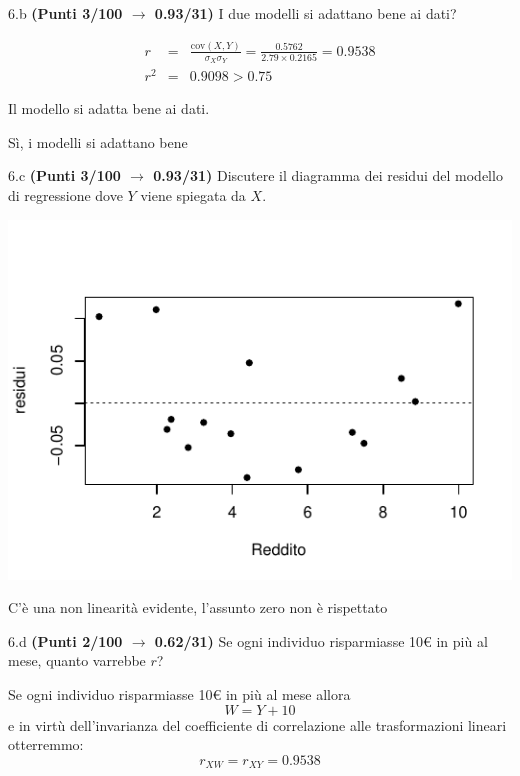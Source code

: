 \documentclass[
  11pt,
]{book}
\theoremstyle{mytheoremstyle}
\theoremstyle{mydefstyle}
\newenvironment{sol}
  {
  \begin{tcolorbox}[enhanced,breakable,arc=0.1mm,boxrule=1pt,colback=white,colframe=iblue,
  title=\bf \fontfamily{lmss}\selectfont \hspace{.5 cm} Soluzione,drop fuzzy shadow]

}{
\end{tcolorbox}
  }
\begin{document}
6.b \textbf{(Punti 3/100 \(\rightarrow\) 0.93/31)} I due modelli si adattano bene ai dati?

\begin{sol}
\begin{eqnarray*}
r&=&\frac{\text{cov}(X,Y)}{\sigma_X\sigma_Y}=\frac{ 0.5762 }{ 2.79 \times 0.2165 }= 0.9538 \\ 
r^2&=& 0.9098 > 0.75
\end{eqnarray*}

Il modello si adatta bene ai dati.

Sì, i modelli si adattano bene

\end{sol}

6.c \textbf{(Punti 3/100 \(\rightarrow\) 0.93/31)} Discutere il diagramma dei residui del modello di regressione dove \(Y\) viene spiegata da \(X\).

\begin{center}\includegraphics{Esami_passati_con_soluzioni_files/figure-latex/2021-74-1} \end{center}

\begin{sol}
C'è una non linearità evidente, l'assunto zero non è rispettato

\end{sol}

6.d \textbf{(Punti 2/100 \(\rightarrow\) 0.62/31)} Se ogni individuo risparmiasse 10€ in più al mese, quanto varrebbe \(r\)?

\begin{sol}
Se ogni individuo risparmiasse 10€ in più al mese allora
\[
W=Y+10
\]
e in virtù dell'invarianza del coefficiente di correlazione alle trasformazioni lineari otterremmo:
\[
r_{XW}=r_{XY}=0.9538
\]

\end{sol}
\end{document}

